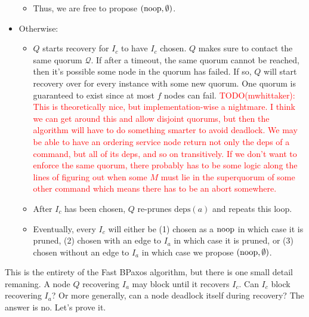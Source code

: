 \documentclass{mwhittaker}
\theoremstyle{definition}
\newcommand{\todo}[2]{\textcolor{red}{TODO(#1): #2}}
\newcommand{\deps}[1]{\text{deps}(#1)}
\begin{document}
\begin{itemize}
\begin{itemize}
      \item
        Thus, we are free to propose $(\text{noop}, \emptyset)$.
    \end{itemize}
  \item
    Otherwise:
    \begin{itemize}
      \item
        $Q$ starts recovery for $I_c$ to have $I_c$ chosen. $Q$ makes sure to
        contact the same quorum $\mathcal{Q}$. If after a timeout, the same
        quorum cannot be reached, then it's possible some node in the quorum
        has failed. If so, $Q$ will start recovery over for every instance with
        some new quorum. One quorum is guaranteed to exist since at most $f$
        nodes can fail.
        \todo{mwhittaker}{%
          This is theoretically nice, but implementation-wise a nightmare. I
          think we can get around this and allow disjoint quorums, but then the
          algorithm will have to do something smarter to avoid deadlock.
          We may be able to have an ordering service node return not only the
          deps of a command, but all of its deps, and so on transitively. If we
          don't want to enforce the same quorum, there probably has to be some
          logic along the lines of figuring out when some $M$ must lie in the
          superquorum of some other command which means there has to be an
          abort somewhere.%
        }

      \item
        After $I_c$ has been chosen, $Q$ re-prunes $\deps{a}$ and repeats this
        loop.

      \item
        Eventually, every $I_c$ will either be (1) chosen as a $\text{noop}$ in which
        case it is pruned, (2) chosen with an edge to $I_a$ in which case it is
        pruned, or (3) chosen without an edge to $I_a$ in which case we propose
        $(\text{noop}, \emptyset)$.
    \end{itemize}
\end{itemize}

This is the entirety of the Fast BPaxos algorithm, but there is one small
detail remaning. A node $Q$ recovering $I_a$ may block until it recovers $I_c$.
Can $I_c$ block recovering $I_a$? Or more generally, can a node deadlock itself
during recovery? The answer is no. Let's prove it.
\end{document}
